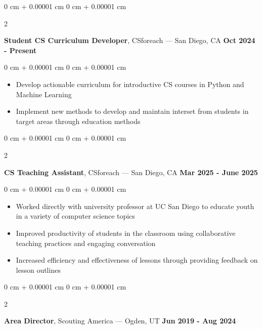 \documentclass[10pt, letterpaper]{article}
\newenvironment{highlights}{
    \begin{itemize}[
        topsep=0.10 cm,
        parsep=0.10 cm,
        partopsep=0pt,
        itemsep=0pt,
        leftmargin=0 cm + 10pt
    ]
}{
    \end{itemize}
} %
\newenvironment{onecolentry}{
    \begin{adjustwidth}{
        0 cm + 0.00001 cm
    }{
        0 cm + 0.00001 cm
    }
}{
    \end{adjustwidth}
} %
\newenvironment{twocolentry}[2][]{
    \onecolentry%
    \def\secondColumn{#2}
    \setcolumnwidth{\fill, 6.0 cm}
    \begin{paracol}{2}
}{
    \switchcolumn\raggedleft\secondColumn%
    \end{paracol}
    \endonecolentry%
} %
\begin{document}
        \vspace{0.2 cm}

        \begin{twocolentry}{
            {\color{secondaryColor}\textbf{Oct 2024 - Present}}
        }
            \textbf{Student CS Curriculum Developer}, CSforeach --- San Diego, CA\end{twocolentry}

        \vspace{0.10 cm}
        \begin{onecolentry}
            \begin{highlights}
                \item Develop actionable curriculum for introductive CS courses in Python and Machine Learning
                \item Implement new methods to develop and maintain interset from students in target areas through education methods
            \end{highlights}
        \end{onecolentry}


        \vspace{0.2 cm}

        \begin{twocolentry}{
            {\color{secondaryColor}\textbf{Mar 2025 - June 2025}}
        }
            \textbf{CS Teaching Assistant}, CSforeach --- San Diego, CA\end{twocolentry}

        \vspace{0.10 cm}
        \begin{onecolentry}
            \begin{highlights}
                \item Worked directly with university professor at UC San Diego to educate youth in a variety of computer science topics
                \item Improved productivity of students in the classroom using collaborative teaching practices and engaging conversation
                \item Increased efficiency and effectiveness of lessons through providing feedback on lesson outlines
            \end{highlights}
        \end{onecolentry}
        
        \vspace{0.2 cm}


        \begin{twocolentry}{
            {\color{secondaryColor}\textbf{Jun 2019 - Aug 2024}}
        }
            \textbf{Area Director}, Scouting America --- Ogden, UT\end{twocolentry}
\end{document}

